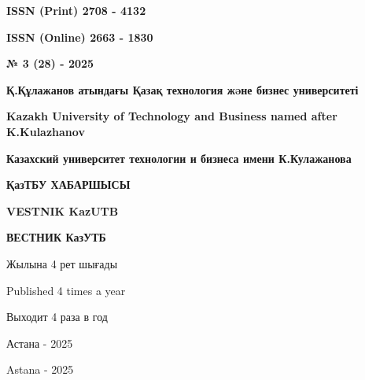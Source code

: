 \begin{flushright}
\textbf{ISSN (Print) 2708 - 4132}

\textbf{ISSN (Online) 2663 - 1830}

\vspace{1cm}

\textbf{№ 3 (28) - 2025}
\end{flushright}

\vfill

\begin{center}
\textbf{\large Қ.Құлажанов атындағы Қазақ технология жəне бизнес университеті}

\vspace{0.3cm}

\textbf{\large Kazakh University of Technology and Business named after K.Kulazhanov}

\vspace{0.3cm}

\textbf{\large Казахский университет технологии и бизнеса имени К.Кулажанова}

\vfill

\textbf{\huge ҚазТБУ ХАБАРШЫСЫ}

\vspace{0.5cm}

\textbf{\huge VESTNIK KazUTB}

\vspace{0.5cm}

\textbf{\huge ВЕСТНИК КазУТБ}

\vfill

Жылына 4 рет шығады

Published 4 times a year

Выходит 4 раза в год

\vfill

Астана - 2025

Astana - 2025
\end{center}

